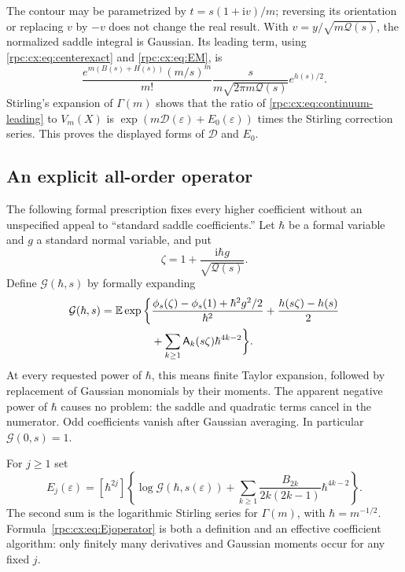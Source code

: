 \documentclass[11pt]{article}
\theoremstyle{definition}
\theoremstyle{remark}
\newcommand{\E}{\mathbb E}
\newcommand{\ii}{\mathrm i}
\numberwithin{equation}{section}
\begin{document}
The contour may be parametrized by $t=s(1+\ii v)/m$;
reversing its orientation or replacing $v$ by $-v$ does not change the
real result. With $v=y/\sqrt{m\mathcal Q(s)}$, the normalized saddle integral is
Gaussian. Its leading term, using \eqref{rpc:cx:eq:centerexact} and
\eqref{rpc:cx:eq:EM}, is
\begin{equation}\label{rpc:cx:eq:continuum-leading}
 \frac{e^{m(B(s)+H(s))}(m/s)^m}{m!}
 \frac{s}{m\sqrt{2\pi m\mathcal Q(s)}}e^{h(s)/2}.
\end{equation}
Stirling's expansion of $\Gamma(m)$ shows that the ratio of
\eqref{rpc:cx:eq:continuum-leading} to $V_m(X)$ is
$\exp(m\mathcal D(\varepsilon)+E_0(\varepsilon))$ times the Stirling correction series.
This proves the displayed forms of $\mathcal D$ and $E_0$.

\subsection{An explicit all-order operator}
The following formal prescription fixes every higher coefficient without
an unspecified appeal to ``standard saddle coefficients.'' Let $\hbar$ be a
formal variable and $g$ a standard normal variable, and put
\begin{equation}
 \zeta=1+\frac{\ii\hbar g}{\sqrt{\mathcal Q(s)}}.
\end{equation}
Define $\mathcal G(\hbar,s)$ by formally expanding
\begin{align}\label{rpc:cx:eq:G}
 \mathcal G(\hbar,s)=\E\exp\bigg\{&
 \frac{\phi_s(\zeta)-\phi_s(1)+\hbar^2g^2/2}{\hbar^2}
 +\frac{h(s\zeta)-h(s)}2\notag\\
 &+\sum_{k\ge1}\mathsf A_k(s\zeta)\hbar^{4k-2}\bigg\}.
\end{align}
At every requested power of $\hbar$, this means finite Taylor expansion,
followed by replacement of Gaussian monomials by their moments.
The apparent negative power of $\hbar$ causes no problem: the saddle and
quadratic terms cancel in the numerator. Odd coefficients vanish after
Gaussian averaging. In particular $\mathcal G(0,s)=1$.

For $j\ge1$ set
\begin{equation}\label{rpc:cx:eq:Ejoperator}
 E_j(\varepsilon)=[\hbar^{2j}]\left\{
 \log \mathcal G(\hbar,s(\varepsilon))+
 \sum_{k\ge1}\frac{B_{2k}}{2k(2k-1)}\hbar^{4k-2}\right\}.
\end{equation}
The second sum is the logarithmic Stirling series for $\Gamma(m)$,
with $\hbar=m^{-1/2}$. Formula~\eqref{rpc:cx:eq:Ejoperator} is both a definition and
an effective coefficient algorithm: only finitely many derivatives and
Gaussian moments occur for any fixed $j$.
\end{document}
